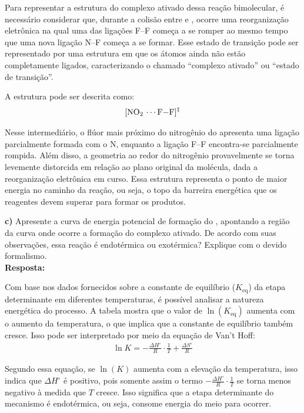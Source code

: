 Para representar a estrutura do complexo ativado dessa reação bimolecular, é necessário considerar que, durante a colisão entre  e , ocorre uma reorganização eletrônica na qual uma das ligações F–F começa a se romper ao mesmo tempo que uma nova ligação N–F começa a se formar. Esse estado de transição pode ser representado por uma estrutura em que os átomos ainda não estão completamente ligados, caracterizando o chamado “complexo ativado” ou “estado de transição”.

A estrutura pode ser descrita como:
\begin{align*}
\ce{[NO2 \cdots F-F]^{\ddagger}}
\end{align*}

Nesse intermediário, o flúor mais próximo do nitrogênio do  apresenta uma ligação parcialmente formada com o N, enquanto a ligação F–F encontra-se parcialmente rompida. Além disso, a geometria ao redor do nitrogênio provavelmente se torna levemente distorcida em relação ao plano original da molécula, dada a reorganização eletrônica em curso. Essa estrutura representa o ponto de maior energia no caminho da reação, ou seja, o topo da barreira energética que os reagentes devem superar para formar os produtos.

\vspace{0.4cm}

\textbf{c)} Apresente a curva de energia potencial de formação do , apontando a região da curva onde ocorre a formação do complexo ativado. De acordo com suas observações, essa reação é endotérmica ou exotérmica? Explique com o devido formalismo.\\

\textbf{Resposta:} 

Com base nos dados fornecidos sobre a constante de equilíbrio (\(K_\text{eq}\)) da etapa determinante em diferentes temperaturas, é possível analisar a natureza energética do processo. A tabela mostra que o valor de \(\ln(K_\text{eq})\) aumenta com o aumento da temperatura, o que implica que a constante de equilíbrio também cresce. Isso pode ser interpretado por meio da equação de Van’t Hoff:
\begin{align*}
\ln K = -\frac{\Delta H^\circ}{R} \cdot \frac{1}{T} + \frac{\Delta S^\circ}{R}
\end{align*}

Segundo essa equação, se \(\ln(K)\) aumenta com a elevação da temperatura, isso indica que \(\Delta H^\circ\) é positivo, pois somente assim o termo \(-\frac{\Delta H^\circ}{R} \cdot \frac{1}{T}\) se torna menos negativo à medida que \(T\) cresce. Isso significa que a etapa determinante do mecanismo é endotérmica, ou seja, consome energia do meio para ocorrer.

